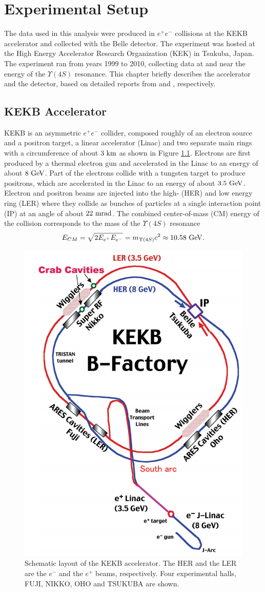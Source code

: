 \chapter{Experimental Setup}
The data used in this analysis were produced in $e^+e^-$ collisions at the KEKB accelerator and collected with the Belle detector. The experiment was hosted at the High Energy Accelerator Research Organization (KEK) in Tsukuba, Japan. The experiment ran
from years 1999 to 2010, collecting data at and near the energy of the $\Upsilon(4S)$ resonance. This chapter briefly describes the accelerator and the detector, based on detailed reports from \cite{doi:10.1093/ptep/pts102} and \cite{ABASHIAN2002117}, respectively.


\section{KEKB Accelerator}
KEKB is an asymmetric $e^+e^-$ collider, composed roughly of an electron source and a positron target, a linear accelerator (Linac) and two separate main rings with a circumference of about $3\mathrm{~km}$ as shown in Figure \ref{fig:kekb}. Electrons are first produced by a thermal electron gun and accelerated in the Linac to an energy of about $8\mathrm{~GeV}$. Part of the electrons collide with a tungsten target to produce positrons, which are accelerated in the Linac to an energy of about $3.5\mathrm{~GeV}$. Electron and positron beams are injected into the high- (HER) and low energy ring (LER) where they collide as bunches of particles at a single interaction point (IP) at an angle of about $22\mathrm{~mrad}$. The combined center-of-mass (CM) energy of the collision corresponds to the mass of the $\Upsilon(4S)$ resonance
\begin{equation}
E_{CM} = \sqrt{2E_{e^+}E_{e^-}} = m_{\Upsilon(4S)}c^2 \approx 10.58\mathrm{~GeV}.
\end{equation}

\begin{figure}[H]
	\centering
	\captionsetup{width=0.8\linewidth}
	\includegraphics[width=0.5\linewidth]{fig/setup/KEKB}
	\caption{Schematic layout of the KEKB accelerator. The HER and the LER are the $e^-$ and the $e^+$ beams, respectively. Four experimental halls, FUJI, NIKKO, OHO and TSUKUBA are shown.}
	\label{fig:kekb}
\end{figure}

